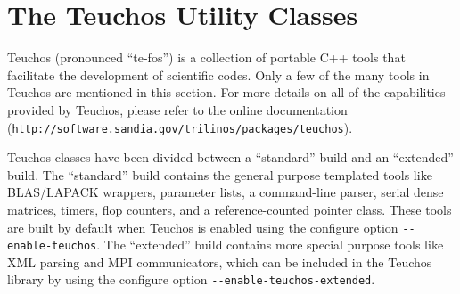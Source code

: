 % 
% 
% 
%   
%   
% 
% 

\chapter{The Teuchos Utility Classes}
\label{chap:teuchos}


\begin{introchapter}
Teuchos (pronounced ``te-fos'') is a collection of portable C++ tools
that facilitate the development of scientific codes.  Only a few of the many
tools in Teuchos are mentioned in this section.
For more details on all of the capabilities provided by Teuchos, please 
refer to the online documentation (\verb!http://software.sandia.gov/trilinos/packages/teuchos!).

Teuchos classes have been divided between a ``standard'' build and an
``extended'' build. The ``standard'' build contains the general purpose
templated tools like BLAS/LAPACK wrappers, parameter lists, a command-line parser,
serial dense matrices, timers, flop counters, and a reference-counted pointer class.  
These tools are built by default when Teuchos is enabled using the 
configure option \verb!--enable-teuchos!. 
The ``extended'' build contains more special purpose tools like 
XML parsing and MPI communicators, which can be included in the Teuchos
library by using the configure option \verb!--enable-teuchos-extended!.
\end{introchapter}

